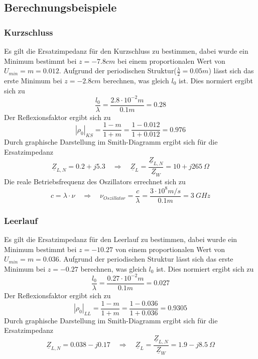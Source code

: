 \documentclass[12pt,a4paper,ngerman]{article}
\begin{document}
\subsection{Berechnungsbeispiele}
\subsubsection{Kurzschluss}
Es gilt die Ersatzimpedanz für den Kurzschluss zu bestimmen, dabei wurde ein Minimum bestimmt bei $z = -7.8cm$ bei einem proportionalen Wert von $U_{min}=m=0.012$. Aufgrund der periodischen Struktur($\frac{\lambda}{2} = 0.05m$) lässt sich das erste Minimum bei $z=-2.8cm$ berechnen, was gleich $l_0$ ist. Dies normiert ergibt sich zu
\begin{equation}
\frac{l_0}{\lambda} = \frac{2.8 \cdot 10^{-2}m}{0.1m} = 0.28
\end{equation}
Der Reflexionsfaktor ergibt sich zu
\begin{equation}
|\rho_0|_{KS} = \frac{1-m}{1+m} = \frac{1-0.012}{1+0.012} = 0.976
\end{equation}
Durch graphische Darstellung im Smith-Diagramm ergibt sich für die Ersatzimpedanz
\begin{equation}
\underline{Z}_{L,N} = 0.2 + j5.3 \quad \Rightarrow \quad \underline{Z}_L = \frac{\underline{Z}_{L,N}}{\underline{Z}_W} = 10 + j265 \ \Omega
\end{equation}
Die reale Betriebsfrequenz des Oszillators errechnet sich zu
\begin{equation}
c = \lambda \cdot \nu \quad \Rightarrow \quad \nu_{Oszillator} = \frac{c}{\lambda} = \frac{3 \cdot 10^8m/s}{0.1m} = 3\ GHz
\end{equation}
\subsubsection{Leerlauf}
Es gilt die Ersatzimpedanz für den Leerlauf zu bestimmen, dabei wurde ein Minimum bestimmt bei $z = -10.27$ von einem proportionalen Wert von $U_{min}=m=0.036$. Aufgrund der periodischen Struktur lässt sich das erste Minimum bei $z=-0.27$ berechnen, was gleich $l_0$ ist. Dies normiert ergibt sich zu
\begin{equation}
\frac{l_0}{\lambda} = \frac{0.27 \cdot 10^{-2}m}{0.1m} = 0.027
\end{equation}
Der Reflexionsfaktor ergibt sich zu
\begin{equation}
|\rho_0|_{LL} = \frac{1-m}{1+m} = \frac{1-0.036}{1+0.036} = 0.9305
\end{equation}
Durch graphische Darstellung im Smith-Diagramm ergibt sich für die Ersatzimpedanz
\begin{equation}
\underline{Z}_{L,N} = 0.038 - j0.17 \quad \Rightarrow \quad \underline{Z}_L = \frac{\underline{Z}_{L,N}}{\underline{Z}_W} = 1.9 - j8.5 \ \Omega
\end{equation}
\pagebreak
\end{document}
